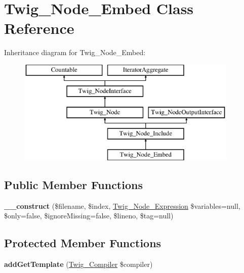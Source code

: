 \hypertarget{class_twig___node___embed}{}\section{Twig\+\_\+\+Node\+\_\+\+Embed Class Reference}
\label{class_twig___node___embed}
Inheritance diagram for Twig\+\_\+\+Node\+\_\+\+Embed\+:\begin{figure}[H]
\begin{center}
\leavevmode
\includegraphics[height=5.000000cm]{class_twig___node___embed}
\end{center}
\end{figure}
\subsection*{Public Member Functions}
\begin{DoxyCompactItemize}
\item 
\hypertarget{class_twig___node___embed_a48750108ff916e667f44f0474427f06b}{}{\bfseries \+\_\+\+\_\+construct} (\$filename, \$index, \hyperlink{class_twig___node___expression}{Twig\+\_\+\+Node\+\_\+\+Expression} \$variables=null, \$only=false, \$ignore\+Missing=false, \$lineno, \$tag=null)\label{class_twig___node___embed_a48750108ff916e667f44f0474427f06b}

\end{DoxyCompactItemize}
\subsection*{Protected Member Functions}
\begin{DoxyCompactItemize}
\item 
\hypertarget{class_twig___node___embed_a899e31f4c948a6fd44a4ec27c4dbe5a3}{}{\bfseries add\+Get\+Template} (\hyperlink{class_twig___compiler}{Twig\+\_\+\+Compiler} \$compiler)\label{class_twig___node___embed_a899e31f4c948a6fd44a4ec27c4dbe5a3}

\end{DoxyCompactItemize}
